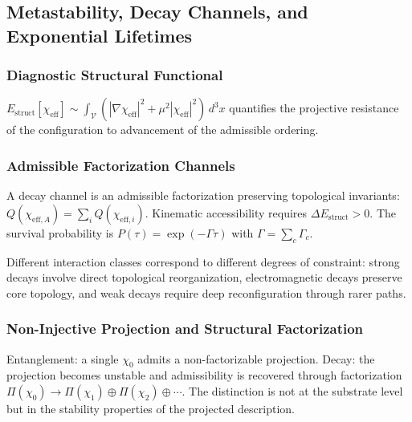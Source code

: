 \subsection{Metastability, Decay Channels, and Exponential Lifetimes}
  \label{subsec:metastability-decay-channels-and-exponential-lifetimes}

  \subsubsection*{Diagnostic Structural Functional}
    \label{subsec:diagnostic-structural-functional}

    $E_{\mathrm{struct}}[\chi_{\mathrm{eff}}]
    \sim \int_\mathcal{V}
    (|\nabla\chi_{\mathrm{eff}}|^2
    + \mu^2|\chi_{\mathrm{eff}}|^2)\,d^3x$
    quantifies the projective resistance of the configuration to
    advancement of the admissible ordering.

  \subsubsection*{Admissible Factorization Channels}
    \label{subsec:admissible-factorization-channels}

    A decay channel is an admissible factorization preserving topological
    invariants:
    $Q(\chi_{\mathrm{eff},A})
    = \sum_i Q(\chi_{\mathrm{eff},i})$.
    Kinematic accessibility requires
    $\Delta E_{\mathrm{struct}} > 0$.
    The survival probability is
    $P(\tau) = \exp(-\Gamma\tau)$ with
    $\Gamma = \sum_c \Gamma_c$.

    Different interaction classes correspond to different degrees of
    constraint: strong decays involve direct topological reorganization,
    electromagnetic decays preserve core topology, and weak decays require
    deep reconfiguration through rarer paths.

  \subsubsection*{Non-Injective Projection and Structural
  Factorization}
    \label{subsec:non-injective-projection-and-structural-factorization}

    Entanglement: a single $\chi_0$ admits a non-factorizable projection.
    Decay: the projection becomes unstable and admissibility is recovered
    through factorization
    $\Pi(\chi_0) \to
    \Pi(\chi_1) \oplus \Pi(\chi_2) \oplus \cdots$.
    The distinction is not at the substrate level but in the stability
    properties of the projected description.
